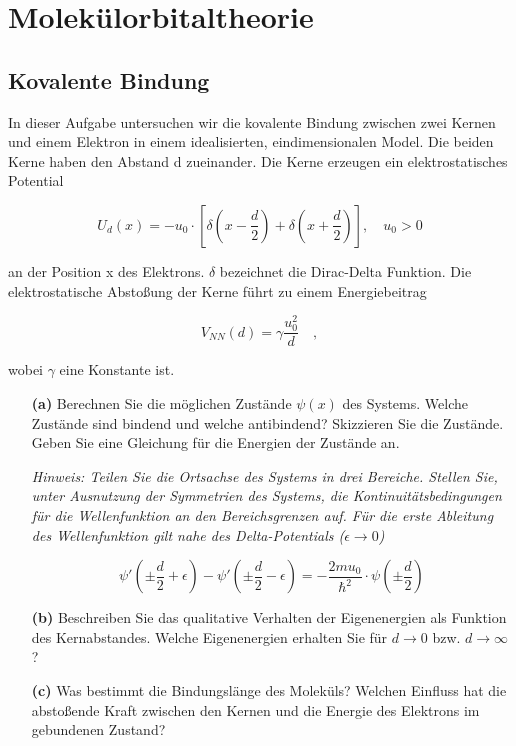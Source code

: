 \renewcommand{\lastmod}{\today}

\chapter{Molekülorbitaltheorie}




\section{Kovalente Bindung}



In dieser Aufgabe untersuchen wir die kovalente Bindung zwischen zwei Kernen und einem Elektron in einem idealisierten, eindimensionalen Model. Die beiden Kerne haben den Abstand d zueinander. Die Kerne erzeugen ein elektrostatisches Potential 

$$ U_d(x) = - u_0 \cdot \left[\delta\left(x - \frac{d}{2}\right) + \delta\left(x + \frac{d}{2}\right)\right], \quad u_0 > 0 $$

an der Position x des Elektrons. $\delta$ bezeichnet die Dirac-Delta Funktion. Die elektrostatische Abstoßung der Kerne führt zu einem Energiebeitrag 

$$ V_{NN}(d) = \gamma \frac{u_0^2}{d}\quad,$$

wobei $\gamma$ eine Konstante ist.

\begin{itemize}

	\item[\textbf{(a)}] Berechnen Sie die möglichen Zustände $\psi(x)$ des Systems. Welche Zustände sind bindend und welche antibindend? Skizzieren Sie die Zustände. Geben Sie eine Gleichung für die Energien der Zustände an. 
	
	\textit{Hinweis: Teilen Sie die Ortsachse des Systems in drei Bereiche. Stellen Sie, unter Ausnutzung der Symmetrien des Systems, die Kontinuitätsbedingungen für die Wellenfunktion an den Bereichsgrenzen auf. Für die erste Ableitung des Wellenfunktion gilt nahe des Delta-Potentials ($\epsilon \rightarrow 0$)} 
	
	$$ \psi'\left(\pm \frac{d}{2} + \epsilon\right) - \psi'\left(\pm \frac{d}{2} - \epsilon\right) = -\frac{2 m u_0}{\hbar^2} \cdot \psi\left(\pm \frac{d}{2}\right) $$

	\item[\textbf{(b)}] Beschreiben Sie das qualitative Verhalten der Eigenenergien als Funktion des Kernabstandes. Welche Eigenenergien erhalten Sie für $d \rightarrow 0$ bzw. $d \rightarrow \infty$?
	
	
	\item[\textbf{(c)}] Was bestimmt die Bindungslänge des Moleküls? Welchen Einfluss hat die abstoßende Kraft zwischen den Kernen und die Energie des Elektrons im gebundenen Zustand?
	


\end{itemize}
	



